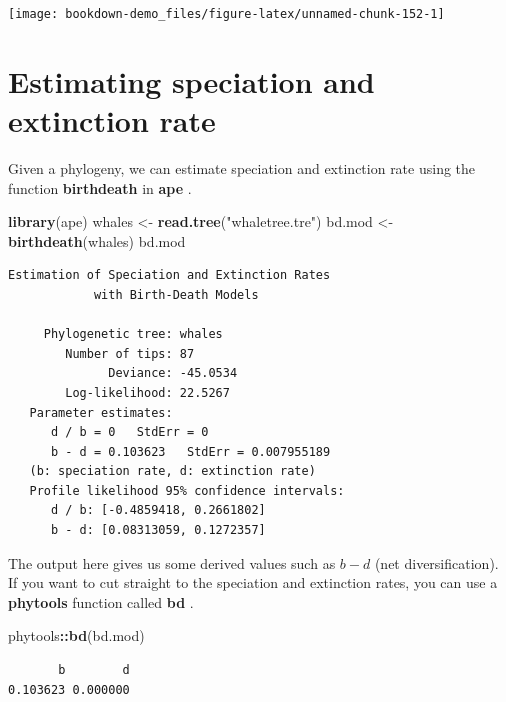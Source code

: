 \documentclass[
]{book}
\newenvironment{Shaded}{\begin{snugshade}}{\end{snugshade}}
\newcommand{\KeywordTok}[1]{\textcolor[rgb]{0.13,0.29,0.53}{\textbf{#1}}}
\newcommand{\NormalTok}[1]{#1}
\newcommand{\OperatorTok}[1]{\textcolor[rgb]{0.81,0.36,0.00}{\textbf{#1}}}
\newcommand{\StringTok}[1]{\textcolor[rgb]{0.31,0.60,0.02}{#1}}
\begin{document}
\begin{center}\texttt{[image: bookdown-demo\_files/figure-latex/unnamed-chunk-152-1]} \end{center}

\hypertarget{estimating-speciation-and-extinction-rate}{%
\section{Estimating speciation and extinction rate}\label{estimating-speciation-and-extinction-rate}}

Given a phylogeny, we can estimate speciation and extinction rate using the function \textbf{birthdeath} in \textbf{ape} \citep{ape}.

\begin{Shaded}
\begin{Highlighting}[]
\KeywordTok{library}\NormalTok{(ape)}
\NormalTok{whales \textless{}{-}}\StringTok{ }\KeywordTok{read.tree}\NormalTok{(}\StringTok{"whaletree.tre"}\NormalTok{)}
\NormalTok{bd.mod \textless{}{-}}\StringTok{ }\KeywordTok{birthdeath}\NormalTok{(whales)}
\NormalTok{bd.mod}
\end{Highlighting}
\end{Shaded}

\begin{verbatim}
Estimation of Speciation and Extinction Rates
            with Birth-Death Models

     Phylogenetic tree: whales 
        Number of tips: 87 
              Deviance: -45.0534 
        Log-likelihood: 22.5267 
   Parameter estimates:
      d / b = 0   StdErr = 0 
      b - d = 0.103623   StdErr = 0.007955189 
   (b: speciation rate, d: extinction rate)
   Profile likelihood 95% confidence intervals:
      d / b: [-0.4859418, 0.2661802]
      b - d: [0.08313059, 0.1272357]
\end{verbatim}

The output here gives us some derived values such as \(b - d\) (net diversification). If you want to cut straight to the speciation and extinction rates, you can use a \textbf{phytools} function called \textbf{bd} \citep{phytools}.

\begin{Shaded}
\begin{Highlighting}[]
\NormalTok{phytools}\OperatorTok{::}\KeywordTok{bd}\NormalTok{(bd.mod)}
\end{Highlighting}
\end{Shaded}

\begin{verbatim}
       b        d 
0.103623 0.000000 
\end{verbatim}
\end{document}
